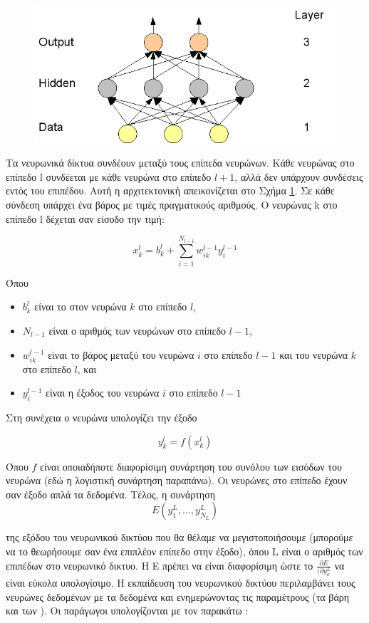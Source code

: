 \begin{figure}[h]
\centering
\includegraphics[scale=0.5]{images/Ch2/feed-forward.png}
\caption{}
\label{fig:Feed Forward Neural Net}
\end{figure}

Τα  νευρωνικά δίκτυα συνδέουν μεταξύ τους επίπεδα νευρώνων. Κάθε νευρώνας  στο επίπεδο l συνδέεται με κάθε νευρώνα στο επίπεδο $l+1$, αλλά δεν υπάρχουν συνδέσεις εντός του επιπέδου. Αυτή η αρχιτεκτονική απεικονίζεται στο Σχήμα \ref{fig:Feed Forward Neural Net}.  Σε κάθε σύνδεση υπάρχει ένα βάρος με τιμές πραγματικούς αριθμούς. Ο νευρώνας k στο επίπεδο l δέχεται σαν είσοδο την τιμή:

$$
x_k^l=b_k^l+\sum_{i=1}^{N_{l-1}} w_{i k}^{l-1} y_i^{l-1}
$$

Όπου 
\begin{itemize}
    \item $b_k^l$   είναι το  στον νευρώνα $k$ στο επίπεδο $l$,
    \item $N_{l-1}$ είναι ο αριθμός των νευρώνων στο επίπεδο $l-1$,
    \item $w_{ik}^{l-1}$  είναι το βάρος μεταξύ του νευρώνα $i$ στο επίπεδο $l-1$ και του νευρώνα $k$ στο επίπεδο $l$, και
    \item $y_{i}^{l-1}$    είναι η έξοδος του νευρώνα $i$ στο επίπεδο $l-1$
\end{itemize}
Στη συνέχεια ο νευρώνα υπολογίζει την έξοδο 

$$
y_k^l=f\left(x_k^l\right)
$$

Όπου $f$ είναι οποιαδήποτε διαφορίσιμη συνάρτηση του συνόλου των εισόδων του νευρώνα (εδώ η λογιστική συνάρτηση παραπάνω).  Οι νευρώνες στο επίπεδο   έχουν σαν έξοδο απλά τα δεδομένα.
Τέλος, η συνάρτηση
$$
E\left(y_1^L, \ldots, y_{N_L}^L\right)
$$

της εξόδου του νευρωνικού δικτύου που θα θέλαμε να μεγιστοποιήσουμε (μπορούμε να το θεωρήσουμε σαν ένα επιπλέον επίπεδο στην έξοδο), όπου L είναι ο αριθμός των επιπέδων στο νευρωνικό δικτυο. Η Ε πρέπει να είναι διαφορίσιμη ώστε το $\frac{\partial{E}}{(\partial y_k^L}$    να είναι εύκολα υπολογίσιμο.
Η εκπαίδευση του νευρωνικού δικτύου περιλαμβάνει  τους νευρώνες δεδομένων με τα δεδομένα και ενημερώνοντας τις παραμέτρους (τα βάρη και των ). Οι παράγωγοι υπολογίζονται με τον παρακάτω :

